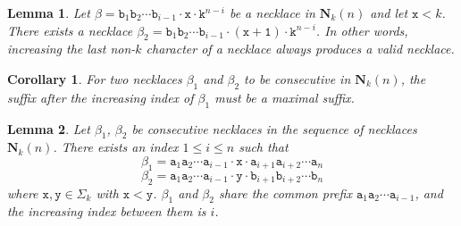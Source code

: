 \documentclass[10pt,a4paper]{amsart}
\newtheorem{lemma}{Lemma}
\newtheorem{corollary}{Corollary}
\newcommand{\bN}{\mathbf{N}}
\newcommand{\bp}{\mathbf{p}}
\newcommand{\bq}{\mathbf{q}}
\newcommand{\defo}[1] {\emph{\textcolor{blue}{#1}}}
\renewcommand{\tt} {\mathtt}
\begin{document}
\begin{lemma} \label{lem:max}
    Let $\beta = \tt{b}_1 \tt{b}_2 \cdots \tt{b}_{i-1} \cdot \tt{x} \cdot \tt{k}^{n-i}$ be a necklace in $\bN_k(n)$ and let $\tt{x}<k$. There exists a necklace $\beta_2 = \tt{b}_1 \tt{b}_2 \cdots \tt{b}_{i-1} \cdot \tt{(x+1)} \cdot \tt{k}^{n-i}$. In other words, increasing the last non-$k$ character of a necklace always produces a valid necklace.

\end{lemma}

\begin{corollary} \label{cor:max2}
    For two necklaces $\beta_1$ and $\beta_2$ to be consecutive in $\bN_k(n)$, the suffix after the increasing index of $\beta_1$ must be a maximal suffix.
\end{corollary}

\begin{lemma} \label{lem:lexorder}
    Let $\beta_1$, $\beta_2$ be consecutive necklaces in the sequence of necklaces $\bN_k(n)$. There exists an index $1 \leq i\leq n$ such that
    \[
    \beta_1 = \tt{a}_1 \tt{a}_2\cdots \tt{a}_{i-1} \cdot \tt{x} \cdot \tt{a}_{i+1} \tt{a}_{i+2} \cdots \tt{a}_n
    \]\[
    \beta_2 = \tt{a}_1 \tt{a}_2\cdots \tt{a}_{i-1} \cdot \tt{y} \cdot \tt{b}_{i+1} \tt{b}_{i+2} \cdots \tt{b}_n
    \]
    where $\tt{x},\tt{y}\in \Sigma_k$ with $\tt{x}<\tt{y}$. $\beta_1$ and $\beta_2$ share the common prefix $\tt{a}_1 \tt{a}_2\cdots \tt{a}_{i-1}$, and the increasing index between them is $i$.
    
\end{lemma}
\end{document}
